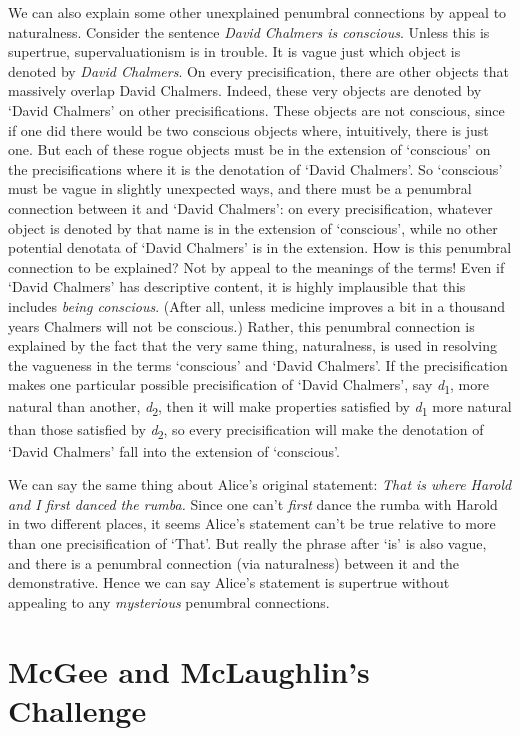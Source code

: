 We can also explain some other unexplained penumbral connections by appeal to naturalness. Consider the sentence \textit{David Chalmers is conscious}. Unless this is supertrue, supervaluationism is in trouble. It is vague just which object is denoted by \textit{David Chalmers}. On every precisification, there are other objects that massively overlap David Chalmers. Indeed, these very objects are denoted by `David Chalmers' on other precisifications. These objects are not conscious, since if one did there would be two conscious objects where, intuitively, there is just one. But each of these rogue objects must be in the extension of `conscious' on the precisifications where it is the denotation of `David Chalmers'. So `conscious' must be vague in slightly unexpected ways, and there must be a penumbral connection between it and `David Chalmers': on every precisification, whatever object is denoted by that name is in the extension of `conscious', while no other potential denotata of `David Chalmers' is in the extension. How is this penumbral connection to be explained? Not by appeal to the meanings of the terms! Even if `David Chalmers' has descriptive content, it is highly implausible that this includes \textit{being conscious}. (After all, unless medicine improves a bit in a thousand years Chalmers will not be conscious.) Rather, this penumbral connection is explained by the fact that the very same thing, naturalness, is used in resolving the vagueness in the terms `conscious' and `David Chalmers'. If the precisification makes one particular possible precisification of `David Chalmers', say \textit{d}\textsubscript{1}, more natural than another, \textit{d}\textsubscript{2}, then it will make properties satisfied by \textit{d}\textsubscript{1­} more natural than those satisfied by \textit{d}\textsubscript{2}, so every precisification will make the denotation of `David Chalmers' fall into the extension of `conscious'.

We can say the same thing about Alice's original statement: \textit{That is where Harold and I first danced the rumba.} Since one can't \textit{first} dance the rumba with Harold in two different places, it seems Alice's statement can't be true relative to more than one precisification of `That'. But really the phrase after `is' is also vague, and there is a penumbral connection (via naturalness) between it and the demonstrative. Hence we can say Alice's statement is supertrue without appealing to any \textit{mysterious }penumbral connections.

\section{McGee and McLaughlin's Challenge}

